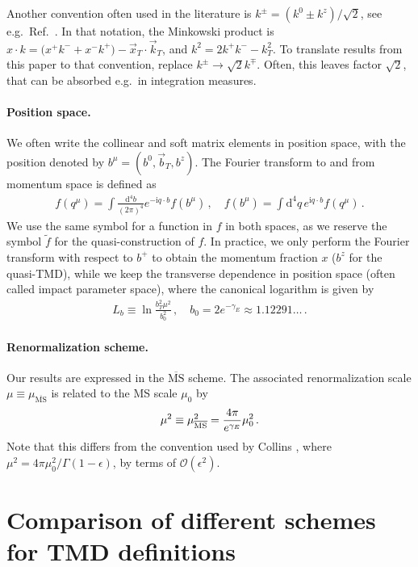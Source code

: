 \documentclass[11pt,a4paper]{article}
\DeclareRobustCommand{\mycite}[1]{Ref.~\cite{#1}}
\newcommand{\MS}{\overline{\mathrm{MS}}}
\newcommand{\df}{\mathrm{d}}
\newcommand{\img}{\mathrm{i}}
\newcommand{\eps}{\epsilon}
\newcommand{\cO}{\mathcal{O}}
\newcommand{\bt}{\vec b_T}
\newcommand{\kt}{\vec k_T}
\begin{document}
Another convention often used in the literature is $k^\pm = (k^0 \pm k^z)/\sqrt{2}$, see e.g.\ \mycite{Collins:1350496}.
In that notation, the Minkowski product is $x \cdot k =\bigl(x^+ k^- + x^- k^+\bigr) - \vec{x}_T \cdot \kt$, and $k^2 = 2 k^+ k^- - k_T^2$.
To translate results from this paper to that convention, replace $k^\pm \to \sqrt{2} k^\mp$.
Often, this leaves factor $\sqrt{2}$, that can be absorbed e.g.\ in integration measures.

\paragraph{Position space.}
We often write the collinear and soft matrix elements in position space,
with the position denoted by $b^\mu = (b^0, \bt, b^z)$.
The Fourier transform to and from momentum space is defined as
\begin{align}
 f(q^\mu) = \int\frac{\df^4 b}{(2\pi)^4} e^{-\img q \cdot b} f(b^\mu)
\,,\quad
 f(b^\mu) = \int \df^4q \, e^{\img q \cdot b} f(q^\mu)
\,.\end{align}
We use the same symbol for a function in $f$ in both spaces,
as we reserve the symbol $\tilde f$ for the quasi-construction of $f$.
%
In practice, we only perform the Fourier transform with respect to $b^+$ to obtain the momentum fraction $x$ ($b^z$ for the quasi-TMD), while we keep the transverse dependence in position space (often called impact parameter space),
where the canonical logarithm is given by
\begin{align} \label{eq:Lb}
 L_b \equiv \ln\frac{b_T^2 \mu^2}{b_0^2} \,, \quad
 b_0 = 2 e^{-\gamma_E} \approx 1.12291\dots
\,.\end{align}

\paragraph{Renormalization scheme.}
Our results are expressed in the $\MS$ scheme.
The associated renormalization scale $\mu \equiv \mu_{\MS}$ is related to the MS scale $\mu_0$ by
\begin{align}
 \mu^2 \equiv \mu^2_{\overline{\rm MS}} = \frac{4\pi}{e^{\gamma_E}} \mu_0^2
\,.\end{align}
Note that this differs from the convention used by Collins \cite{Collins:1350496},
where $\mu^2 = 4\pi \mu_0^2 / \Gamma(1-\eps)$, by terms of $\cO(\eps^2)$.


\section{Comparison of different schemes for TMD definitions}
\label{app:overview_tmdpdfs}
\end{document}
